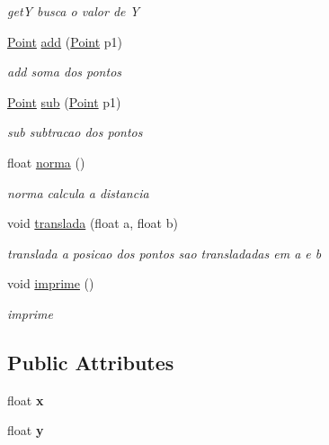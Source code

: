 \begin{DoxyCompactItemize}
\begin{DoxyCompactList}\small\item\em getY busca o valor de Y \end{DoxyCompactList}\item 
\hyperlink{classPoint}{Point} \hyperlink{classPoint_a9dbea84b07b0a8ec3bbb9e58b3d15899}{add} (\hyperlink{classPoint}{Point} p1)
\begin{DoxyCompactList}\small\item\em add soma dos pontos \end{DoxyCompactList}\item 
\hyperlink{classPoint}{Point} \hyperlink{classPoint_a9cf2c53b0a4e6282a6712824bb4e9b00}{sub} (\hyperlink{classPoint}{Point} p1)
\begin{DoxyCompactList}\small\item\em sub subtracao dos pontos \end{DoxyCompactList}\item 
float \hyperlink{classPoint_abd2618d1f505d9392893273a66e7c9b2}{norma} ()
\begin{DoxyCompactList}\small\item\em norma calcula a distancia \end{DoxyCompactList}\item 
void \hyperlink{classPoint_ad9676e36f3444534b609e3c68422239a}{translada} (float a, float b)
\begin{DoxyCompactList}\small\item\em translada a posicao dos pontos sao transladadas em a e b \end{DoxyCompactList}\item 
void \hyperlink{classPoint_a1fb5c2501c27ab2cbc99d06c2a26a741}{imprime} ()\hypertarget{classPoint_a1fb5c2501c27ab2cbc99d06c2a26a741}{}\label{classPoint_a1fb5c2501c27ab2cbc99d06c2a26a741}

\begin{DoxyCompactList}\small\item\em imprime \end{DoxyCompactList}\end{DoxyCompactItemize}
\subsection*{Public Attributes}
\begin{DoxyCompactItemize}
\item 
float {\bfseries x}\hypertarget{classPoint_a05dfe2dfbde813ad234b514f30e662f1}{}\label{classPoint_a05dfe2dfbde813ad234b514f30e662f1}

\item 
float {\bfseries y}\hypertarget{classPoint_a6101960c8d2d4e8ea1d32c9234bbeb8d}{}\label{classPoint_a6101960c8d2d4e8ea1d32c9234bbeb8d}

\end{DoxyCompactItemize}


